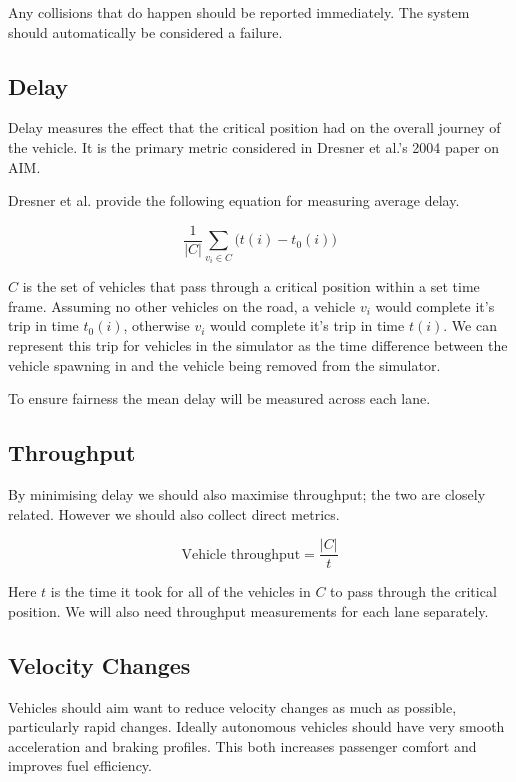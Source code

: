 Any collisions that do happen should be reported immediately. The system should automatically be considered a failure.

\subsection{Delay}
\label{subsec:Delay}
Delay measures the effect that the critical position had on the overall journey of the vehicle. It is the primary metric considered in Dresner et al.'s 2004 paper \citep{Dresner2004} on AIM.

Dresner et al. provide the following equation for measuring average delay.

\begin{equation}
\frac{1}{|C|}\sum_{v_i\in{C}}\bigl(t(i) - t_0(i)\bigr)
\end{equation}

$C$ is the set of vehicles that pass through a critical position within a set time frame. Assuming no other vehicles on the road, a vehicle $v_i$ would complete it's trip in time $t_0(i)$, otherwise $v_i$ would complete it's trip in time $t(i)$. We can represent this trip for vehicles in the simulator as the time difference between the vehicle spawning in and the vehicle being removed from the simulator.

To ensure fairness the mean delay will be measured across each lane.

\subsection{Throughput}
\label{subsec:Throughput}
By minimising delay we should also maximise throughput; the two are closely related. However we should also collect direct metrics.

\begin{equation}
\text{Vehicle throughput} = \frac{|C|}{t}
\end{equation}

Here $t$ is the time it took for all of the vehicles in $C$ to pass through the critical position. We will also need throughput measurements for each lane separately.

\subsection{Velocity Changes}
\label{subsec:Velocity Changes}
Vehicles should aim want to reduce velocity changes as much as possible, particularly rapid changes. Ideally autonomous vehicles should have very smooth acceleration and braking profiles. This both increases passenger comfort and improves fuel efficiency.

